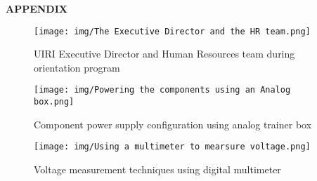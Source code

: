 \documentclass[12pt,a4paper]{report}
\begin{document}
\newpage
\appendix

{\fontsize{14}{16.8}\selectfont\bfseries\centering APPENDIX\par}
\vspace{10pt}

\begin{figure}[H]
\centering
\texttt{[image: img/The Executive Director and the HR team.png]}
\caption{UIRI Executive Director and Human Resources team during orientation program}
\label{fig:uiri-leadership}
\end{figure}

\begin{figure}[H]
\centering
\texttt{[image: img/Powering the components using an Analog box.png]}
\caption{Component power supply configuration using analog trainer box}
\label{fig:analog-power}
\end{figure}

\begin{figure}[H]
\centering
\texttt{[image: img/Using a multimeter to mearsure voltage.png]}
\caption{Voltage measurement techniques using digital multimeter}
\label{fig:multimeter-usage}
\end{figure}

\end{document}
